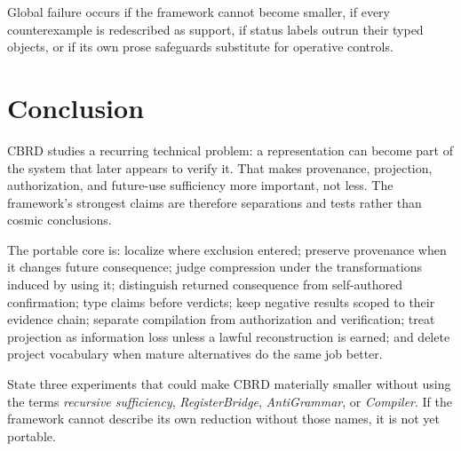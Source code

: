 Global failure occurs if the framework cannot become smaller, if every counterexample is redescribed as support, if status labels outrun their typed objects, or if its own prose safeguards substitute for operative controls.

\section{Conclusion}

CBRD studies a recurring technical problem: a representation can become part of the system that later appears to verify it. That makes provenance, projection, authorization, and future-use sufficiency more important, not less. The framework's strongest claims are therefore separations and tests rather than cosmic conclusions.

The portable core is: localize where exclusion entered; preserve provenance when it changes future consequence; judge compression under the transformations induced by using it; distinguish returned consequence from self-authored confirmation; type claims before verdicts; keep negative results scoped to their evidence chain; separate compilation from authorization and verification; treat projection as information loss unless a lawful reconstruction is earned; and delete project vocabulary when mature alternatives do the same job better.

\begin{readercheck}
State three experiments that could make CBRD materially smaller without using the terms \emph{recursive sufficiency}, \emph{RegisterBridge}, \emph{AntiGrammar}, or \emph{Compiler}. If the framework cannot describe its own reduction without those names, it is not yet portable.
\end{readercheck}
